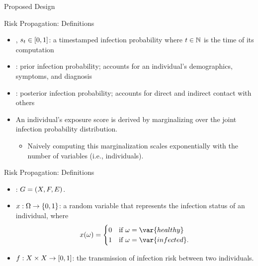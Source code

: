 \documentclass[11pt]{beamer}
\begin{document}
\begin{section}{Proposed Design}

\begin{frame}{Risk Propagation: Definitions}
\begin{itemize}
  \item {}, $s_t \in [0, 1]$: a timestamped infection probability where $t \in \mathbb{N}$ is the time of its computation
  \item {}: prior infection probability; accounts for an individual's demographics, symptoms, and diagnosis \citep{Briers2020, Menni2020}
  \item {}: posterior infection probability; accounts for direct and indirect contact with others
  \item An individual's exposure score is derived by marginalizing over the joint infection probability distribution.
    \begin{itemize}
      \item Naively computing this marginalization scales exponentially with the number of variables (i.e., individuals).
    \end{itemize}
\end{itemize}
\end{frame}

\begin{frame}{Risk Propagation: Definitions}
\begin{itemize}
  \item {}: $G = (X, F, E)$.
  \item {} $\vVariable: \eventSpace \rightarrow \{0, 1\} $: a random variable that represents the infection status of an individual, where
    \begin{equation*}
      \vVariable(\event) =
        \begin{cases}
          0 & \text{if } \event = \var{healthy} \\
          1 & \text{if } \event = \var{infected}.
        \end{cases}
    \end{equation*}
    \item {} $\vFactor: \vVariables \times \vVariables \rightarrow [0, 1]$: the transmission of infection risk between two individuals.
\end{itemize}


\end{frame}
\end{section}
\end{document}
